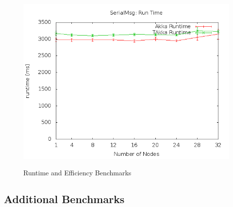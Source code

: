 \begin{figure}[p]
\begin{center}
{            \includegraphics[scale=0.31]{efficiency/SerialMsg_time.png}
        }
        \\
    \end{center}
    \caption{Runtime and Efficiency Benchmarks}
   \label{runtime_efficiency}
\end{figure}



\subsection{Additional Benchmarks}
\label{bench_fib}

